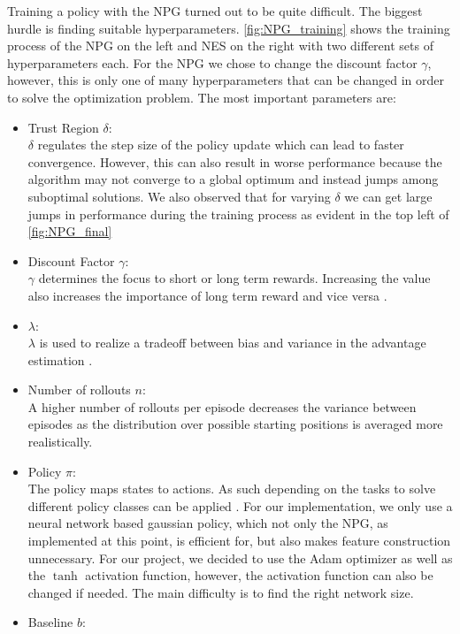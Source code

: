 Training a policy with the NPG turned out to be quite difficult. The biggest hurdle is finding suitable hyperparameters. \autoref{fig:NPG_training} shows the training process of the NPG on the left and NES on the right with two different sets of hyperparameters each. For the NPG we chose to change the discount factor $\gamma$, however, this is only one of many hyperparameters that can be changed in order to solve the optimization problem. \newpage
The most important parameters are:
\begin{itemize}
  \item Trust Region $\delta$: \\
  $\delta$ regulates the step size of the policy update which can lead to faster convergence. However, this can also result in worse performance because the algorithm may not converge to a global optimum and instead jumps among suboptimal solutions. We also observed that for varying $\delta$ we can get large jumps in performance during the training process as evident in the top left of \autoref{fig:NPG_final}\smallskip
  \item Discount Factor $\gamma$: \\
  $\gamma$ determines the focus to short or long term rewards. Increasing the value also increases the importance of long term reward and vice versa \cite{Schulman2018}.\smallskip
  \item $\lambda$: \\
  $\lambda$ is used to realize a tradeoff between bias and variance in the advantage estimation \cite{Schulman2018}.\smallskip
  \item Number of rollouts $n$: \\
  A higher number of rollouts per episode decreases the variance between episodes as the distribution over possible starting positions is averaged more realistically.\smallskip
  \item Policy $\pi$: \\
  The policy maps states to actions. As such depending on the tasks to solve different policy classes can be applied \cite{Rajeswaran2017}. For our implementation, we only use a neural network based gaussian policy, which not only the NPG, as implemented at this point, is efficient for, but also makes feature construction unnecessary. For our project, we decided to use the Adam optimizer as well as the $\tanh$ activation function, however, the activation function can also be changed if needed. The main difficulty is to find the right network size.\smallskip
  \item Baseline $b$: \\

\end{itemize}
